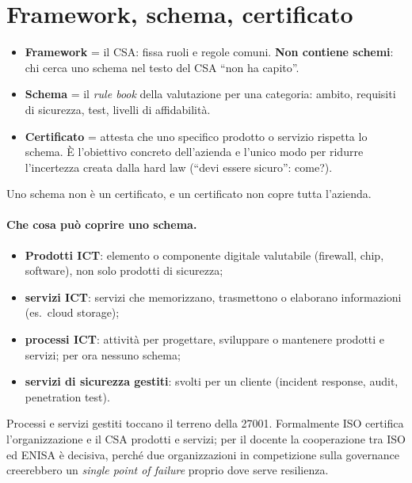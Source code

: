 \section{Framework, schema, certificato}
\label{sec:csa-schema}

\begin{itemize}
  \item \textbf{Framework} = il CSA: fissa ruoli e regole comuni. \textbf{Non contiene schemi}: chi cerca
    uno schema nel testo del CSA ``non ha capito''.
  \item \textbf{Schema} = il \emph{rule book} della valutazione per una categoria: ambito, requisiti di
    sicurezza, test, livelli di affidabilità.
  \item \textbf{Certificato} = attesta che uno specifico prodotto o servizio rispetta lo schema. È
    l'obiettivo concreto dell'azienda e l'unico modo per ridurre l'incertezza creata dalla hard law
    (``devi essere sicuro'': come?).
\end{itemize}
Uno schema non è un certificato, e un certificato non copre tutta l'azienda.

\paragraph{Che cosa può coprire uno schema.}
\begin{itemize}
  \item \textbf{Prodotti ICT}: elemento o componente digitale valutabile (firewall, chip, software), non
    solo prodotti di sicurezza;
  \item \textbf{servizi ICT}: servizi che memorizzano, trasmettono o elaborano informazioni (es.\ cloud
    storage);
  \item \textbf{processi ICT}: attività per progettare, sviluppare o mantenere prodotti e servizi; per ora
    nessuno schema;
  \item \textbf{servizi di sicurezza gestiti}: svolti per un cliente (incident response, audit,
    penetration test).
\end{itemize}
Processi e servizi gestiti toccano il terreno della 27001. Formalmente ISO certifica l'organizzazione e
il CSA prodotti e servizi; per il docente la cooperazione tra ISO ed ENISA è decisiva, perché due
organizzazioni in competizione sulla governance creerebbero un \emph{single point of failure} proprio
dove serve resilienza.

